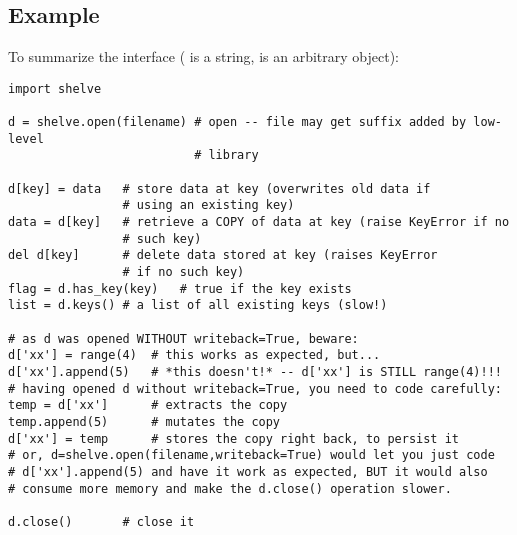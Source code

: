 \subsection{Example}

To summarize the interface ( is a string,  is an
arbitrary object):

\begin{verbatim}
import shelve

d = shelve.open(filename) # open -- file may get suffix added by low-level
                          # library

d[key] = data   # store data at key (overwrites old data if
                # using an existing key)
data = d[key]   # retrieve a COPY of data at key (raise KeyError if no
                # such key)
del d[key]      # delete data stored at key (raises KeyError
                # if no such key)
flag = d.has_key(key)   # true if the key exists
list = d.keys() # a list of all existing keys (slow!)

# as d was opened WITHOUT writeback=True, beware:
d['xx'] = range(4)  # this works as expected, but...
d['xx'].append(5)   # *this doesn't!* -- d['xx'] is STILL range(4)!!!
# having opened d without writeback=True, you need to code carefully:
temp = d['xx']      # extracts the copy
temp.append(5)      # mutates the copy
d['xx'] = temp      # stores the copy right back, to persist it
# or, d=shelve.open(filename,writeback=True) would let you just code
# d['xx'].append(5) and have it work as expected, BUT it would also
# consume more memory and make the d.close() operation slower.

d.close()       # close it
\end{verbatim}

\begin{seealso}
\end{seealso}

